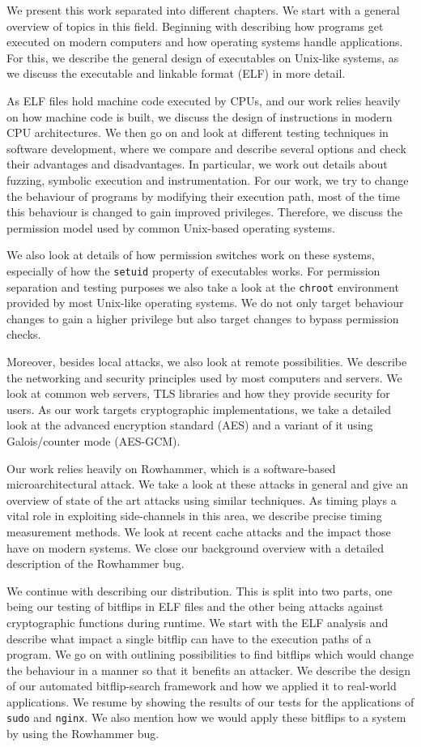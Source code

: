 We present this work separated into different chapters. We start with a general
overview of topics in this field. Beginning with describing how programs get
executed on modern computers and how operating systems handle applications. For
this, we describe the general design of executables on Unix-like systems, as we
discuss the executable and linkable format (ELF) in more detail.

As ELF files hold machine code executed by CPUs, and our work relies heavily on
how machine code is built, we discuss the design of instructions in modern
CPU architectures.  We then go on and look at different testing techniques in
software development, where we compare and describe several options and check
their advantages and disadvantages. In particular, we work out details about
fuzzing, symbolic execution and instrumentation. For our work, we try to change
the behaviour of programs by modifying their execution path, most of the time
this behaviour is changed to gain improved privileges. Therefore, we discuss the
permission model used by common Unix-based operating systems.

We also look at details of how permission switches work on these systems,
especially of how the \texttt{setuid} property of executables works. For
permission separation and testing purposes we also take a look at the
\texttt{chroot} environment provided by most Unix-like operating systems. We
do not only target behaviour changes to gain a higher privilege but also target
changes to bypass permission checks.

Moreover, besides local attacks, we also look at remote possibilities. We
describe the networking and security principles used by most computers and
servers. We look at common web servers, TLS libraries and how they provide
security for users. As our work targets cryptographic implementations, we take
a detailed look at the advanced encryption standard (AES) and a variant of it
using Galois/counter mode (AES-GCM).

Our work relies heavily on Rowhammer, which is a software-based
microarchitectural attack. We take a look at these attacks in general and give
an overview of state of the art attacks using similar techniques. As timing
plays a vital role in exploiting side-channels in this area, we describe precise
timing measurement methods. We look at recent cache attacks and the impact
those have on modern systems. We close our background overview with a detailed
description of the Rowhammer bug.

We continue with describing our distribution. This is split into two parts, one
being our testing of bitflips in ELF files and the other being attacks against
cryptographic functions during runtime. We start with the ELF analysis and
describe what impact a single bitflip can have to the execution paths of a
program. We go on with outlining possibilities to find bitflips which would
change the behaviour in a manner so that it benefits an attacker. We describe
the design of our automated bitflip-search framework and how we applied it to
real-world applications. We resume by showing the results of our tests for
the applications of \texttt{sudo} and \texttt{nginx}. We also mention how we
would apply these bitflips to a system by using the Rowhammer bug.

